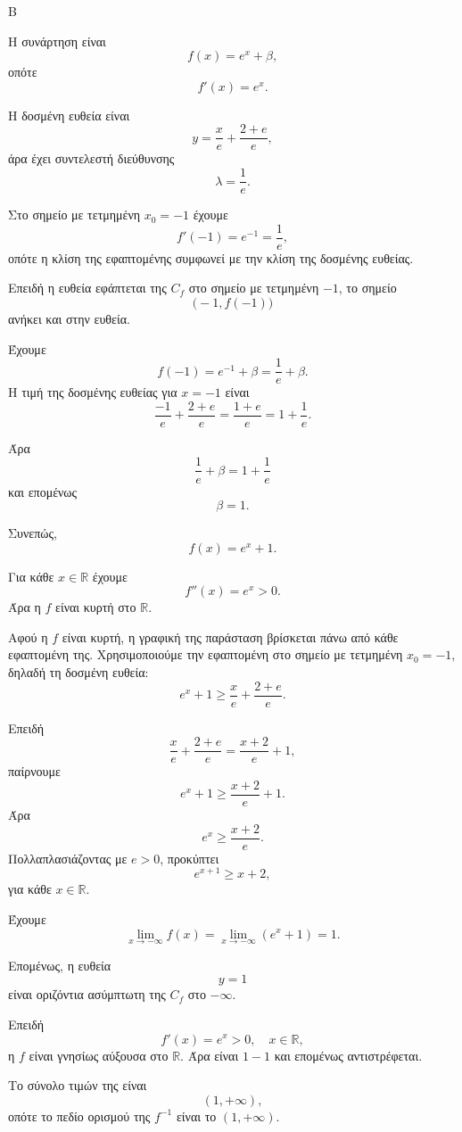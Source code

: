

\begin{thema}{Β}
\begin{erwthma}
\item Η συνάρτηση είναι
\[
f(x)=e^x+\beta,
\]
οπότε
\[
f'(x)=e^x.
\]

Η δοσμένη ευθεία είναι
\[
y=\frac{x}{e}+\frac{2+e}{e},
\]
άρα έχει συντελεστή διεύθυνσης
\[
\lambda=\frac{1}{e}.
\]

Στο σημείο με τετμημένη $x_0=-1$ έχουμε
\[
f'(-1)=e^{-1}=\frac{1}{e},
\]
οπότε η κλίση της εφαπτομένης συμφωνεί με την κλίση της δοσμένης ευθείας.

Επειδή η ευθεία εφάπτεται της $C_f$ στο σημείο με τετμημένη $-1$, το σημείο
\[
\bigl(-1,f(-1)\bigr)
\]
ανήκει και στην ευθεία.

Έχουμε
\[
f(-1)=e^{-1}+\beta=\frac{1}{e}+\beta.
\]
Η τιμή της δοσμένης ευθείας για $x=-1$ είναι
\[
\frac{-1}{e}+\frac{2+e}{e}=\frac{1+e}{e}=1+\frac{1}{e}.
\]

Άρα
\[
\frac{1}{e}+\beta=1+\frac{1}{e}
\]
και επομένως
\[
\beta=1.
\]

Συνεπώς,
\[
f(x)=e^x+1.
\]

\item Για κάθε $x\in\mathbb{R}$ έχουμε
\[
f''(x)=e^x>0.
\]
Άρα η $f$ είναι κυρτή στο $\mathbb{R}$.

Αφού η $f$ είναι κυρτή, η γραφική της παράσταση βρίσκεται πάνω από κάθε εφαπτομένη της. Χρησιμοποιούμε την εφαπτομένη στο σημείο με τετμημένη $x_0=-1$, δηλαδή τη δοσμένη ευθεία:
\[
e^x+1\geq \frac{x}{e}+\frac{2+e}{e}.
\]

Επειδή
\[
\frac{x}{e}+\frac{2+e}{e}=\frac{x+2}{e}+1,
\]
παίρνουμε
\[
e^x+1\geq \frac{x+2}{e}+1.
\]
Άρα
\[
e^x\geq \frac{x+2}{e}.
\]
Πολλαπλασιάζοντας με $e>0$, προκύπτει
\[
e^{x+1}\geq x+2,
\]
για κάθε $x\in\mathbb{R}$.

\item Έχουμε
\[
\lim_{x\to-\infty} f(x)=\lim_{x\to-\infty}(e^x+1)=1.
\]

Επομένως, η ευθεία
\[
y=1
\]
είναι οριζόντια ασύμπτωτη της $C_f$ στο $-\infty$.

\item Επειδή
\[
f'(x)=e^x>0,\quad x\in\mathbb{R},
\]
η $f$ είναι γνησίως αύξουσα στο $\mathbb{R}$. Άρα είναι $1-1$ και επομένως αντιστρέφεται.

Το σύνολο τιμών της είναι
\[
(1,+\infty),
\]
οπότε το πεδίο ορισμού της $f^{-1}$ είναι το $(1,+\infty)$.


\end{erwthma}
\end{thema}
